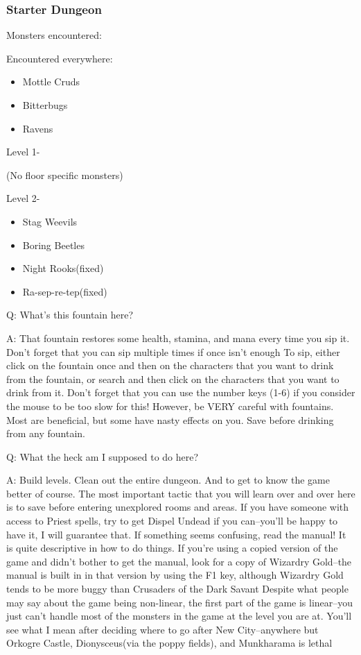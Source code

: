\documentclass[12pt]{article}
\providecommand{\tightlist}{%
  \setlength{\itemsep}{0pt}\setlength{\parskip}{0pt}}
\begin{document}
\subsubsection{Starter Dungeon}\label{starter-dungeon}

Monsters encountered:

Encountered everywhere:

\begin{itemize}
\tightlist
\item
  Mottle Cruds
\item
  Bitterbugs
\item
  Ravens
\end{itemize}

Level 1-

(No floor specific monsters)

Level 2-

\begin{itemize}
\tightlist
\item
  Stag Weevils
\item
  Boring Beetles
\item
  Night Rooks(fixed)
\item
  Ra-sep-re-tep(fixed)
\end{itemize}

Q: What's this fountain here?

A: That fountain restores some health, stamina, and mana every time you
sip it. Don't forget that you can sip multiple times if once isn't
enough To sip, either click on the fountain once and then on the
characters that you want to drink from the fountain, or search and then
click on the characters that you want to drink from it. Don't forget
that you can use the number keys (1-6) if you consider the mouse to be
too slow for this! However, be VERY careful with fountains. Most are
beneficial, but some have nasty effects on you. Save before drinking
from any fountain.

Q: What the heck am I supposed to do here?

A: Build levels. Clean out the entire dungeon. And to get to know the
game better of course. The most important tactic that you will learn
over and over here is to save before entering unexplored rooms and
areas. If you have someone with access to Priest spells, try to get
Dispel Undead if you can--you'll be happy to have it, I will guarantee
that. If something seems confusing, read the manual! It is quite
descriptive in how to do things. If you're using a copied version of the
game and didn't bother to get the manual, look for a copy of Wizardry
Gold--the manual is built in in that version by using the F1 key,
although Wizardry Gold tends to be more buggy than Crusaders of the Dark
Savant Despite what people may say about the game being non-linear, the
first part of the game is linear--you just can't handle most of the
monsters in the game at the level you are at. You'll see what I mean
after deciding where to go after New City--anywhere but Orkogre Castle,
Dionysceus(via the poppy fields), and Munkharama is lethal
\end{document}
